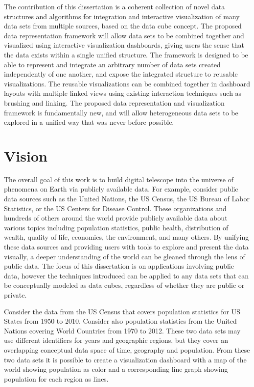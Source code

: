 The contribution of this dissertation is a coherent collection of novel data structures and algorithms for integration and interactive visualization of many data sets from multiple sources, based on the data cube concept. The proposed data representation framework will allow data sets to be combined together and visualized using interactive visualization dashboards, giving users the sense that the data exists within a single unified structure. The framework is designed to be able to represent and integrate an arbitrary number of data sets created independently of one another, and expose the integrated structure to reusable visualizations. The reusable visualizations can be combined together in dashboard layouts with multiple linked views using existing interaction techniques such as brushing and linking. The proposed data representation and visualization framework is fundamentally new, and will allow heterogeneous data sets to be explored in a unified way that was never before possible. 

\section{Vision}
The overall goal of this work is to build digital telescope into the universe of phenomena on Earth via publicly available data. For example, consider public data sources such as the United Nations, the US Census, the US Bureau of Labor Statistics, or the US Centers for Disease Control. These organizations and hundreds of others around the world provide publicly available data about various topics including population statistics, public health, distribution of wealth, quality of life, economics, the environment, and many others. By unifying these data sources and providing users with tools to explore and present the data visually, a deeper understanding of the world can be gleaned through the lens of public data. The focus of this dissertation is on applications involving public data, however the techniques introduced can be applied to any data sets that can be conceptually modeled as data cubes, regardless of whether they are public or private. 

Consider the data from the US Census that covers population statistics for US States from 1950 to 2010. Consider also population statistics from the United Nations covering World Countries from 1970 to 2012. These two data sets may use different identifiers for years and geographic regions, but they cover an overlapping conceptual data space of time, geography and population. From these two data sets it is possible to create a visualization dashboard with a map of the world showing population as color and a corresponding line graph showing population for each region as lines.


